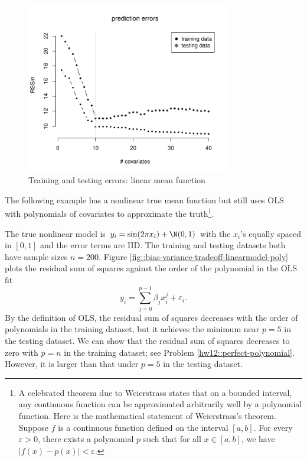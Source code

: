  
\begin{figure}[th]
\centering 
\includegraphics[width = 0.8\textwidth]{figures/training_testing_error.pdf}
\caption{Training and testing errors: linear mean function}\label{fig::bias-variance-tradeoff-linearmodel}
\end{figure}



The following example has a nonlinear true mean function but still uses OLS with polynomials of covariates to approximate the truth\footnote{A celebrated theorem due to Weierstrass states that on a bounded interval, any continuous function can be approximated arbitrarily well by a polynomial function. Here is the mathematical statement of Weierstrass's theorem.  
Suppose $f$ is a continuous function defined on the interval $[a, b]$. For every $\varepsilon  > 0$, there exists a polynomial $p$ such that for all $x \in [a, b]$, we have $|f(x) - p(x) | < \varepsilon $.}. 




\begin{example}
The true nonlinear model is $y_i  = \sin(2\pi x_i) + \N(0,1)$ with the $x_i$'s equally spaced in $[0,1]$ and the error terms are IID. The training and testing datasets both have sample sizes $n=200$. Figure \ref{fig::bias-variance-tradeoff-linearmodel-poly} plots the residual sum of squares against the order of the polynomial in the OLS fit
$$
y_i = \sum_{j=0}^{p-1} \beta_j x_i^j + \varepsilon_i.
$$
By the definition of OLS, the residual sum of squares decreases with the order of polynomials in the training dataset, but it achieves the minimum near $p=5$ in the testing dataset. We can show that the residual sum of squares decreases to zero with $p=n$ in the training dataset; see Problem \ref{hw12::perfect-polynomial}. However, it is larger than that under $p=5$ in the testing dataset. 
\end{example}


